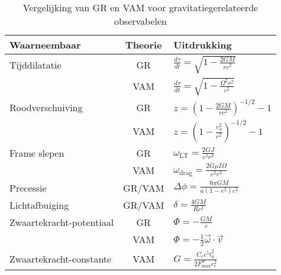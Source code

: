 \begin{table}[ht]
    \centering
    \caption{Vergelijking van GR en VAM voor gravitatiegerelateerde observabelen}
    \label{tab:VAM-GR}
    \begin{tabular}{|l|c|l|}
        \hline
        \textbf{Waarneembaar} & \textbf{Theorie} & \textbf{Uitdrukking} \\
        \hline
        Tijddilatatie & GR & $  \frac{d\tau}{dt} = \sqrt{1 - \frac{2GM}{rc^2}} $ \\
        & VAM & $  \frac{d\tau}{dt} = \sqrt{1 - \frac{\Omega^2 r^2}{c^2}} $ \\
        \hline
        Roodverschuiving & GR & $  z = \left(1 - \frac{2GM}{rc^2} \right)^{-1/2} - 1 $ \\
        & VAM & $  z = \left(1 - \frac{v_\phi^2}{c^2} \right)^{-1/2} - 1 $ \\
        \hline
        Frame slepen & GR & $  \omega_\text{LT} = \frac{2GJ}{c^2 r^3} $ \\
        & VAM & $  \omega_\text{drag} = \frac{2G \mu I \Omega}{c^2 r^3} $ \\
        \hline
        Precessie & GR/VAM & $  \Delta\phi = \frac{6\pi GM}{a(1 - e^2)c^2} $ \\
        \hline
        Lichtafbuiging & GR/VAM & $  \delta = \frac{4GM}{Rc^2} $ \\
        \hline
        Zwaartekracht-potentiaal & GR & $  \Phi = -\frac{GM}{r} $ \\
        & VAM & $  \Phi = -\frac{1}{2} \vec{\omega} \cdot \vec{v} $ \\
        \hline
        Zwaartekracht-constante & VAM & $  G = \frac{C_e c^5 t_p^2}{2 F^{\text{\ae}}_{\text{max}} r_c^2} $ \\
        \hline
    \end{tabular}
\end{table}

